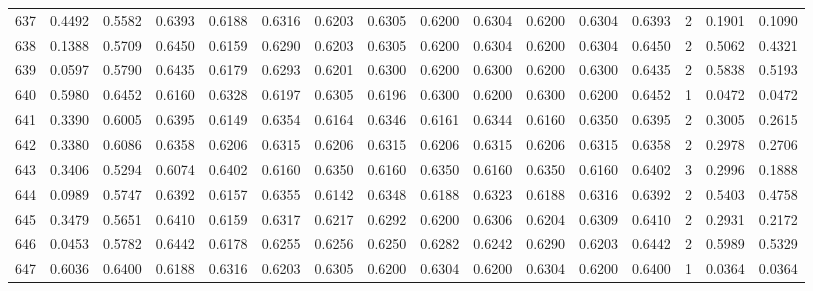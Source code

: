 \begin{tabular}{lrrrrrrrrrrrrrrr}
637 &      0.4492 &  0.5582 &  0.6393 &  0.6188 &  0.6316 &  0.6203 &  0.6305 &  0.6200 &  0.6304 &  0.6200 &   0.6304 &     0.6393 &      2 &                    0.1901 &                     0.1090 \\
638 &      0.1388 &  0.5709 &  0.6450 &  0.6159 &  0.6290 &  0.6203 &  0.6305 &  0.6200 &  0.6304 &  0.6200 &   0.6304 &     0.6450 &      2 &                    0.5062 &                     0.4321 \\
639 &      0.0597 &  0.5790 &  0.6435 &  0.6179 &  0.6293 &  0.6201 &  0.6300 &  0.6200 &  0.6300 &  0.6200 &   0.6300 &     0.6435 &      2 &                    0.5838 &                     0.5193 \\
640 &      0.5980 &  0.6452 &  0.6160 &  0.6328 &  0.6197 &  0.6305 &  0.6196 &  0.6300 &  0.6200 &  0.6300 &   0.6200 &     0.6452 &      1 &                    0.0472 &                     0.0472 \\
641 &      0.3390 &  0.6005 &  0.6395 &  0.6149 &  0.6354 &  0.6164 &  0.6346 &  0.6161 &  0.6344 &  0.6160 &   0.6350 &     0.6395 &      2 &                    0.3005 &                     0.2615 \\
642 &      0.3380 &  0.6086 &  0.6358 &  0.6206 &  0.6315 &  0.6206 &  0.6315 &  0.6206 &  0.6315 &  0.6206 &   0.6315 &     0.6358 &      2 &                    0.2978 &                     0.2706 \\
643 &      0.3406 &  0.5294 &  0.6074 &  0.6402 &  0.6160 &  0.6350 &  0.6160 &  0.6350 &  0.6160 &  0.6350 &   0.6160 &     0.6402 &      3 &                    0.2996 &                     0.1888 \\
644 &      0.0989 &  0.5747 &  0.6392 &  0.6157 &  0.6355 &  0.6142 &  0.6348 &  0.6188 &  0.6323 &  0.6188 &   0.6316 &     0.6392 &      2 &                    0.5403 &                     0.4758 \\
645 &      0.3479 &  0.5651 &  0.6410 &  0.6159 &  0.6317 &  0.6217 &  0.6292 &  0.6200 &  0.6306 &  0.6204 &   0.6309 &     0.6410 &      2 &                    0.2931 &                     0.2172 \\
646 &      0.0453 &  0.5782 &  0.6442 &  0.6178 &  0.6255 &  0.6256 &  0.6250 &  0.6282 &  0.6242 &  0.6290 &   0.6203 &     0.6442 &      2 &                    0.5989 &                     0.5329 \\
647 &      0.6036 &  0.6400 &  0.6188 &  0.6316 &  0.6203 &  0.6305 &  0.6200 &  0.6304 &  0.6200 &  0.6304 &   0.6200 &     0.6400 &      1 &                    0.0364 &                     0.0364 \\

\end{tabular}
